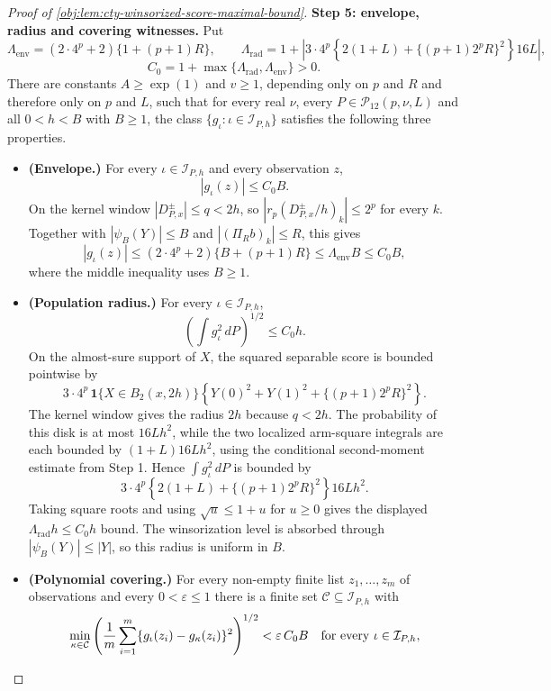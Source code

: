 \begin{proof}[Proof of \cref{obj:lem:cty-winsorized-score-maximal-bound}]
\textbf{Step 5: envelope, radius and covering witnesses.}  Put
\[
\Lambda_{\mathrm{env}}=(2\cdot4^p+2)\{1+(p+1)R\},
\qquad
\Lambda_{\mathrm{rad}}=1+\left|3\cdot4^p\left\{2(1+L)+\{(p+1)2^pR\}^2\right\}16L\right|,
\]
\[
C_0=1+\max\{\Lambda_{\mathrm{rad}},\Lambda_{\mathrm{env}}\}>0 .
\]
There are constants \(A\geq\exp(1)\) and \(v\geq1\), depending only on \(p\) and \(R\) and therefore only on \(p\) and \(L\), such that for every real \(\nu\), every \(P\in\mathcal P_{12}(p,\nu,L)\) and all \(0<h<B\) with \(B\geq1\), the class \(\{g_\iota:\iota\in\mathcal I_{P,h}\}\) satisfies the following three properties.
\begin{itemize}
\item \textbf{(Envelope.)} For every \(\iota\in\mathcal I_{P,h}\) and every observation \(z\),
\[
|g_\iota(z)|\leq C_0B .
\]
On the kernel window \(|D^{\pm}_{P,x}|\leq q<2h\), so \(|r_p(D^{\pm}_{P,x}/h)_k|\leq2^p\) for every \(k\).  Together with \(|\psi_B(Y)|\leq B\) and \(|(\Pi_Rb)_k|\leq R\), this gives
\[
|g_\iota(z)|
\leq
(2\cdot4^p+2)\{B+(p+1)R\}
\leq \Lambda_{\mathrm{env}}B
\leq C_0B,
\]
where the middle inequality uses \(B\geq1\).
\item \textbf{(Population radius.)} For every \(\iota\in\mathcal I_{P,h}\),
\[
\left(\int g_\iota^2\,dP\right)^{1/2}\leq C_0h .
\]
On the almost-sure support of \(X\), the squared separable score is bounded pointwise by
\[
3\cdot4^p\,\mathbf 1\{X\in B_2(x,2h)\}
\left\{Y(0)^2+Y(1)^2+\{(p+1)2^pR\}^2\right\}.
\]
The kernel window gives the radius \(2h\) because \(q<2h\).  The probability of this disk is at most \(16Lh^2\), while the two localized arm-square integrals are each bounded by \((1+L)16Lh^2\), using the conditional second-moment estimate from Step 1.  Hence \(\int g_\iota^2\,dP\) is bounded by
\[
3\cdot4^p\left\{2(1+L)+\{(p+1)2^pR\}^2\right\}16Lh^2.
\]
Taking square roots and using \(\sqrt u\leq 1+u\) for \(u\geq0\) gives the displayed \(\Lambda_{\mathrm{rad}}h\leq C_0h\) bound.  The winsorization level is absorbed through \(|\psi_B(Y)|\leq |Y|\), so this radius is uniform in \(B\).
\item \textbf{(Polynomial covering.)} For every non-empty finite list \(z_1,\ldots,z_m\) of observations and every \(0<\varepsilon\leq1\) there is a finite set \(\mathcal C\subseteq\mathcal I_{P,h}\) with
\[
\min_{\kappa\in\mathcal C}
\left({1\over m}\sum_{i=1}^m\{g_\iota(z_i)-g_\kappa(z_i)\}^2\right)^{1/2}
<\varepsilon\,C_0B
\quad\text{for every }\iota\in\mathcal I_{P,h},
\]

\end{itemize}
\end{proof}
